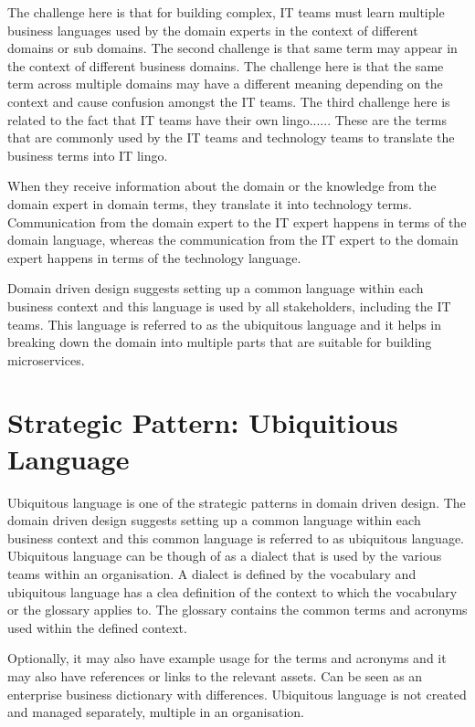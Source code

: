 The challenge here is that for building complex, IT teams must learn multiple business languages used by the domain experts in the context of different domains or sub domains.
The second challenge is that same term may appear in the context of different business domains.
The challenge here is that the same term across multiple domains may have a different meaning depending on the context and cause confusion amongst the IT teams.
The third challenge here is related to the fact that IT teams have their own lingo......
These are the terms that are commonly used by the IT teams and technology teams to translate the business terms into IT lingo.

When they receive information about the domain or the knowledge from the domain expert in domain terms, they translate it into technology terms.
Communication from the domain expert to the IT expert happens in terms of the domain language, whereas the communication from the IT expert to the domain expert happens in terms of the technology language.

Domain driven design suggests setting up a common language within each business context and this language is used by all stakeholders, including the IT teams.
This language is referred to as the ubiquitous language and it helps in breaking down the domain into multiple parts that are suitable for building microservices.

\section{Strategic Pattern: Ubiquitious Language}
Ubiquitous language is one of the strategic patterns in domain driven design.
The domain driven design suggests setting up a common language within each business context and this common language is referred to as ubiquitous language.
Ubiquitous language can be though of as a dialect that is used by the various teams within an organisation.
A dialect is defined by the vocabulary and ubiquitous language has a clea definition of the context to which the vocabulary or the glossary applies to.
The glossary contains the common terms and acronyms used within the defined context.

Optionally, it may also have example usage for the terms and acronyms and it may also have references or links to the relevant assets.
Can be seen as an enterprise business dictionary with differences.
Ubiquitous language is not created and managed separately, multiple in an organisation.

